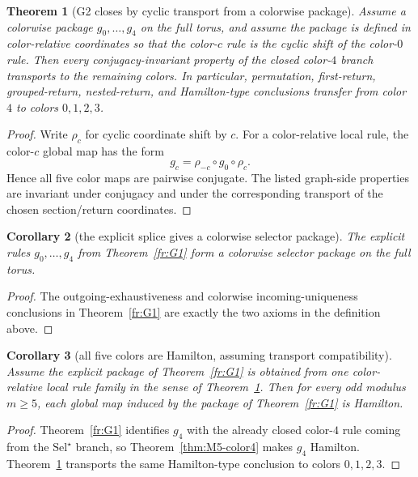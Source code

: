 \documentclass[11pt]{article}
\newtheorem{theorem}{Theorem}[section]
\newtheorem{corollary}[theorem]{Corollary}
\newcommand{\SelStar}{\mathrm{Sel}^{\star}}
\begin{document}
\begin{theorem}[G2 closes by cyclic transport from a colorwise package]
\label{thm:G2-closed}
Assume a colorwise package \(g_0,\dots,g_4\) on the full torus, and assume the
package is defined in color-relative
coordinates so that the color-$c$ rule is the cyclic shift of the color-$0$
rule.  Then every conjugacy-invariant property of the closed color-$4$ branch
transports to the remaining colors.  In particular, permutation, first-return,
grouped-return, nested-return, and Hamilton-type conclusions transfer from
color $4$ to colors \(0,1,2,3\).
\end{theorem}

\begin{proof}
Write \(\rho_c\) for cyclic coordinate shift by \(c\).  For a color-relative
local rule, the color-$c$ global map has the form
\[
 g_c = \rho_{-c}\circ g_0\circ \rho_c.
\]
Hence all five color maps are pairwise conjugate.  The listed graph-side
properties are invariant under conjugacy and under the corresponding transport
of the chosen section/return coordinates.
\end{proof}

\begin{corollary}[the explicit splice gives a colorwise selector package]
\label{cor:colorwise-package}
The explicit rules $g_0,\dots,g_4$ from Theorem~\ref{fr:G1} form a colorwise
selector package on the full torus.
\end{corollary}

\begin{proof}
The outgoing-exhaustiveness and colorwise incoming-uniqueness conclusions in
Theorem~\ref{fr:G1} are exactly the two axioms in the definition above.
\end{proof}

\begin{corollary}[all five colors are Hamilton, assuming transport compatibility]
\label{cor:all-five-hamilton}
Assume the explicit package of Theorem~\ref{fr:G1} is obtained from one
color-relative local rule family in the sense of
Theorem~\ref{thm:G2-closed}.
Then for every odd modulus $m\ge 5$, each global map induced by the package of
Theorem~\ref{fr:G1} is Hamilton.
\end{corollary}

\begin{proof}
Theorem~\ref{fr:G1} identifies $g_4$ with the already closed color-$4$ rule
coming from the $\SelStar$ branch, so Theorem~\ref{thm:M5-color4} makes $g_4$
Hamilton.  Theorem~\ref{thm:G2-closed} transports the same Hamilton-type
conclusion to colors $0,1,2,3$.
\end{proof}
\end{document}
